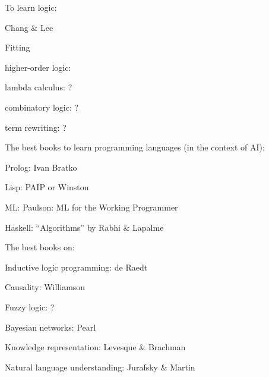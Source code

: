 To learn logic:
\begin{compactenum-}[\textbullet ]
\item Chang $\&$ Lee
\item Fitting
\item higher-order logic:
\item lambda calculus: ?
\item combinatory logic: ?
\item term rewriting: ?
\end{compactenum-}

The best books to learn programming languages (in the context of AI):
\begin{compactenum-}[\textbullet ]
\item Prolog: Ivan Bratko
\item Lisp: PAIP or Winston
\item ML: Paulson: ML for the Working Programmer
\item Haskell: ``Algorithms'' by Rabhi $\&$ Lapalme
\end{compactenum-}

The best books on:
\begin{compactenum-}[\textbullet ]
\item Inductive logic programming: de Raedt
\item Causality: Williamson
\item Fuzzy logic: ?
\item Bayesian networks: Pearl
\item Knowledge representation: Levesque $\&$ Brachman
\item Natural language understanding: Jurafsky $\&$ Martin
\end{compactenum-}
